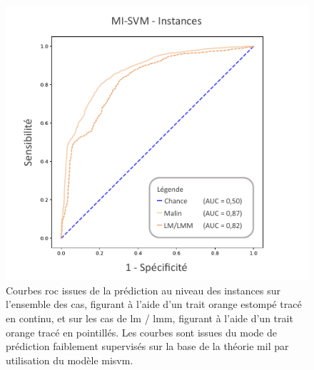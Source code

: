\begin{figure}[H]
    \centering
    \includegraphics[width=0.7\linewidth]{contents/chapter_7/resources/results_lesion_roc_instances.pdf}
    \caption{Courbes \gls{roc} issues de la prédiction au niveau des instances sur l'ensemble des cas, figurant à l'aide d'un trait orange estompé tracé en continu, et sur les cas de \gls{lm} / \gls{lmm}, figurant à l'aide d'un trait orange tracé en pointillés. Les courbes sont issues  du mode de prédiction faiblement supervisés sur la base de la théorie \gls{mil} par utilisation du modèle \gls{misvm}.}
    \label{fig:results_lesion_roc_instances}
\end{figure}\par

